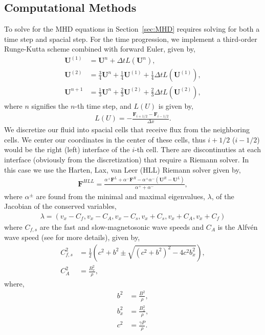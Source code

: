 \documentclass[iop,twocolumn]{emulateapj}
\begin{document}
\subsection{Computational Methods}
To solve for the MHD equations in Section~\ref{sec:MHD} requires solving for both a time step and spacial step. For the time progression, we implement a third-order Runge-Kutta scheme combined with forward Euler, given by,
\begin{align*}
  {\bm U}^{(1)}&={\bm U}^n+\Delta t L({\bm U}^n),\\
  {\bm U}^{(2)}&=\frac{3}{4}{\bm U}^n+\frac{1}{4}{\bm U}^{(1)}+\frac{1}{4}\Delta t L({\bm U}^{(1)}),\\
  {\bm U}^{n+1}&=\frac{1}{3}{\bm U}^n+\frac{2}{3}{\bm U}^{(2)}+\frac{2}{3}\Delta t L({\bm U}^{(2)}),
\end{align*}
where $n$ signifies the $n$-th time step, and $L(U)$ is given by,
\begin{align*}
  L(U)=-\frac{{\bm F}_{i+1/2}-{\bm F}_{i-1/2}}{\Delta x}.
\end{align*}
We discretize our fluid into spacial cells that receive flux from the neighboring cells. We center our coordinates in the center of these cells, thus $i+1/2$ ($i-1/2$) would be the right (left) interface of the $i$-th cell. There are discontinuties at each interface (obviously from the discretization) that require a Riemann solver. In this case we use the Harten, Lax, van Leer (HLL) Riemann solver given by,
\begin{align*}
  {\bm F}^{HLL}=\frac{\alpha^+{\bm F}^L+\alpha^-{\bm F}^R-\alpha^+\alpha^-({\bm U}^R-{\bm U}^L)}{\alpha^++\alpha^-},
\end{align*}
where $\alpha^\pm$ are found from the minimal and maximal eigenvalues, $\lambda$, of the Jacobian of the conserved variables,
\begin{align*}
  \lambda=(v_x-C_f,v_x-C_A,v_x-C_s,v_x+C_s,v_x+C_A,v_x+C_f)
\end{align*}
where $C_{f,s}$ are the fast and slow-magnetosonic wave speeds and $C_A$ is the Alfv{\'e}n wave speed (see \cite{stone08a} for more details), given by,
\begin{align*}
  C_{f,s}^2&=\frac{1}{2}\left(c^2+b^2\pm\sqrt{(c^2+b^2)^2-4c^2b_x^2}\right),\\
  C_A^2&=\frac{B_x^2}{\rho},
\end{align*}
where,
\begin{align*}
  b^2&=\frac{B^2}{\rho},\\
  b_x^2&=\frac{B_x^2}{\rho},\\
  c^2&=\frac{\gamma P}{\rho}.
\end{align*}
\end{document}
